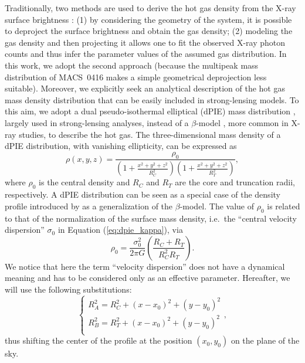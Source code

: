 \documentclass[twocolumn]{aastex61}
\begin{document}
Traditionally, two methods are used to derive the hot gas density from the X-ray surface
brightness \citep[see][and references therein]{Ettori2013}: (1) by considering the geometry of the system, it is
possible to deproject the surface brightness and obtain the gas
density; (2) modeling the gas density and then projecting it allows one
to fit the observed X-ray photon counts and thus infer the parameter values of the assumed
gas distribution.
In this work, we adopt the second approach (because the multipeak mass 
distribution of MACS~0416 makes a simple geometrical deprojection less suitable).
Moreover, we explicitly seek an analytical description of the hot gas mass
density distribution that can be easily included in strong-lensing models.
To this aim, we adopt a dual pseudo-isothermal elliptical (dPIE) mass 
distribution \citep{Eliasdottir2007,Suyu2010}, largely used in
strong-lensing analyses, instead of a $\beta$-model \citep{Cavaliere1976,Sarazin1977},
more common in X-ray studies, to describe the hot gas.
The three-dimensional mass density of a dPIE distribution, with vanishing ellipticity,
can be expressed as \citep{Limousin2005}
\begin{equation}
\rho(x,y,z) = \frac{\rho_{0}}{
    \left( 1 + \frac{ x^2 + y^2 + z^2 }{ R_{C}^2 } \right)
    \left( 1 + \frac{ x^2 + y^2 + z^2 }{ R_{T}^2 } \right)
},
\label{eq:dpie_3Ddens}
\end{equation}
where $\rho_0$ is the central density and $R_C$ and $R_T$ are the core and
truncation radii, respectively.
A dPIE distribution can be seen as a special case of the density profile introduced
by \citet{Vikhlinin2006} as a generalization of the $\beta$-model.
The value of $\rho_0$ is related to that of the normalization of the surface
mass density, i.e.\ the ``central velocity dispersion'' $\sigma_0$ in Equation (\ref{eq:dpie_kappa}), via
\begin{equation}
    \rho_0 = \frac{\sigma_0^2}{2 \pi G} \left( \frac{R_C + R_T}{R_C^2R_T} \right).
\end{equation}
We notice that here the term ``velocity dispersion'' does not have a dynamical
meaning and has to be considered only as an effective parameter.
Hereafter, we will use the following substitutions:
\begin{equation}
\left\{
\begin{array}{lr}
    R_A^2 = R_{C}^2 + (x-x_0)^2 + (y-y_0)^2\\
    R_B^2 = R_{T}^2 + (x-x_0)^2 + (y-y_0)^2\\
\end{array}
\right. ,
\label{eq:dpie_radii}
\end{equation}
thus shifting the center of the profile at the position $(x_0,y_0)$ on the plane of the
sky.
\end{document}
